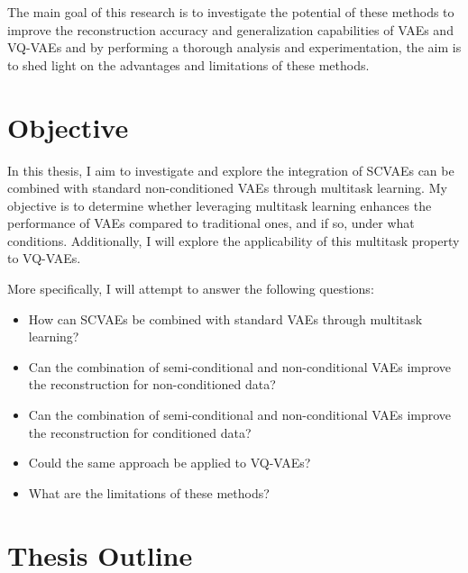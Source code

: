 The main goal of this research is to investigate the potential of these methods to improve the reconstruction accuracy and generalization capabilities of VAEs and VQ-VAEs and by performing a thorough analysis and experimentation, the aim is to shed light on the advantages and limitations of these methods.

\section{Objective}

In this thesis, I aim to investigate and explore the integration of SCVAEs can be combined with standard non-conditioned VAEs through multitask learning. My objective is to determine whether leveraging multitask learning enhances the performance of VAEs compared to traditional ones, and if so, under what conditions. Additionally, I will explore the applicability of this multitask property to VQ-VAEs.

More specifically, I will attempt to answer the following questions:

\begin{itemize}
    \item How can SCVAEs be combined with standard VAEs through multitask learning?
    \item Can the combination of semi-conditional and non-conditional VAEs improve the reconstruction for non-conditioned data?
    \item Can the combination of semi-conditional and non-conditional VAEs improve the reconstruction for conditioned data?
    \item Could the same approach be applied to VQ-VAEs?
    \item What are the limitations of these methods?
\end{itemize}



\section{Thesis Outline}



